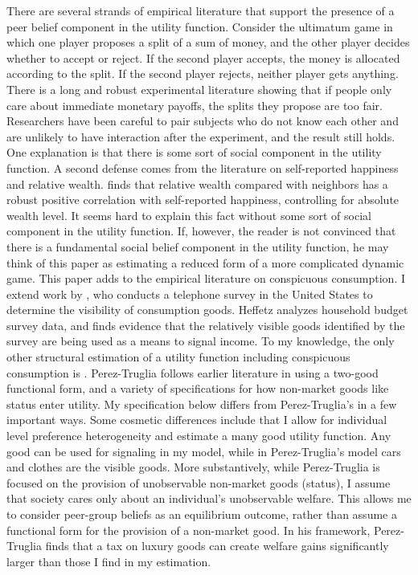 \documentclass[12pt]{article}
\begin{document}
There are several strands of empirical literature that support the presence of a peer belief component in the utility function.  Consider the ultimatum game in which one player proposes a split of a sum of money, and the other player decides whether to accept or reject.  If the second player accepts, the money is allocated according to the split. If the second player rejects, neither player gets anything.  There is a long and robust experimental literature showing that if people only care about immediate monetary payoffs, the splits they propose are too fair.  Researchers have been careful to pair subjects who do not know each other and are unlikely to have interaction after the experiment, and the result still holds.  One explanation is that there is some sort of social component in the utility function. \citep{FehrSchmidt1999,BoltonOckenfels2000}  A second defense comes from the literature on self-reported happiness and relative wealth.  \citet{Luttmer2004} finds that relative wealth compared with neighbors has a robust positive correlation  with self-reported happiness, controlling for absolute wealth level.  It seems hard to explain this fact without some sort of social component in the utility function.  If, however, the reader is not convinced that there is a fundamental social belief component in the utility function, he may think of this paper as estimating a reduced form of a more complicated dynamic game.  
This paper adds to the empirical literature on conspicuous consumption.\citep{Blochetal2004,Charlesetal2009,MoavNeeman2010,MoavNeeman2012}  I extend work by \citet{Heffetz2011}, who conducts a telephone survey in the United States to determine the visibility of consumption goods.  Heffetz analyzes household budget survey data, and finds evidence that the relatively visible goods identified by the survey are being used as a means to signal income.  To my knowledge, the only other structural estimation of a utility function including conspicuous consumption is \citet{perez2013measuring}.  Perez-Truglia follows earlier literature in using a two-good functional form, and a variety of specifications for how non-market goods like status enter utility.  My specification below differs from Perez-Truglia's in a few important ways.  Some cosmetic differences include that I allow for individual level preference heterogeneity and estimate a many good utility function.  Any good can be used for signaling in my model, while in Perez-Truglia's model cars and clothes are the visible goods.  More substantively, while Perez-Truglia is focused on the provision of unobservable non-market goods (status), I assume that society cares only about an individual's unobservable welfare.  This allows me to consider peer-group beliefs as an equilibrium outcome, rather than assume a functional form for the provision of a non-market good.  In his framework, Perez-Truglia finds that a tax on luxury goods can create welfare gains significantly larger than those I find in my estimation.
\end{document}
